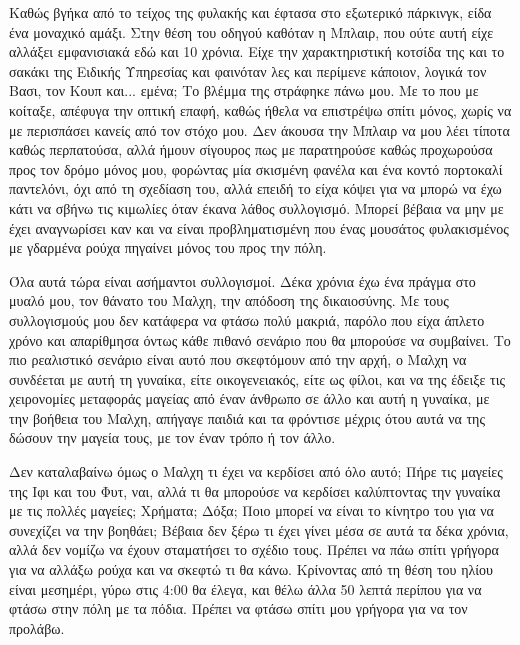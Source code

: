 \documentclass[12pt,twoside, openany]{book}
\begin{document}
Καθώς βγήκα από το τείχος της φυλακής και έφτασα στο εξωτερικό πάρκινγκ, είδα ένα μοναχικό αμάξι. Στην θέση του οδηγού καθόταν η Μπλαιρ, που ούτε αυτή είχε αλλάξει εμφανισιακά εδώ και 10 χρόνια. Είχε την χαρακτηριστική κοτσίδα της και το σακάκι της Ειδικής Υπηρεσίας και φαινόταν λες και περίμενε κάποιον, λογικά τον Βασι, τον Κουπ και... εμένα; Το βλέμμα της στράφηκε πάνω μου. Με το που με κοίταξε, απέφυγα την οπτική επαφή, καθώς ήθελα να επιστρέψω σπίτι μόνος, χωρίς να με περισπάσει κανείς από τον στόχο μου. Δεν άκουσα την Μπλαιρ να μου λέει τίποτα καθώς περπατούσα, αλλά ήμουν σίγουρος πως με παρατηρούσε καθώς προχωρούσα προς τον δρόμο μόνος μου, φορώντας μία σκισμένη φανέλα και ένα κοντό πορτοκαλί παντελόνι, όχι από τη σχεδίαση του, αλλά επειδή το είχα κόψει για να μπορώ να έχω κάτι να σβήνω τις κιμωλίες όταν έκανα λάθος συλλογισμό. Μπορεί βέβαια να μην με έχει αναγνωρίσει καν και να είναι προβληματισμένη που ένας μουσάτος φυλακισμένος με γδαρμένα ρούχα πηγαίνει μόνος του προς την πόλη.

Όλα αυτά τώρα είναι ασήμαντοι συλλογισμοί. Δέκα χρόνια έχω ένα πράγμα στο μυαλό μου, τον θάνατο του Μαλχη, την απόδοση της δικαιοσύνης. Με τους συλλογισμούς μου δεν κατάφερα να φτάσω πολύ μακριά, παρόλο που είχα άπλετο χρόνο και απαρίθμησα όντως κάθε πιθανό σενάριο που θα μπορούσε να συμβαίνει. Το πιο ρεαλιστικό σενάριο είναι αυτό που σκεφτόμουν από την αρχή, ο Μαλχη να συνδέεται με αυτή τη γυναίκα, είτε οικογενειακός, είτε ως φίλοι, και να της έδειξε τις χειρονομίες μεταφοράς μαγείας από έναν άνθρωπο σε άλλο και αυτή η γυναίκα, με την βοήθεια του Μαλχη, απήγαγε παιδιά και τα φρόντισε μέχρις ότου αυτά να της δώσουν την μαγεία τους, με τον έναν τρόπο ή τον άλλο.

Δεν καταλαβαίνω όμως ο Μαλχη τι έχει να κερδίσει από όλο αυτό; Πήρε τις μαγείες της Ιφι και του Φυτ, ναι, αλλά τι θα μπορούσε να κερδίσει καλύπτοντας την γυναίκα με τις πολλές μαγείες; Χρήματα; Δόξα; Ποιο μπορεί να είναι το κίνητρο του για να συνεχίζει να την βοηθάει; Βέβαια δεν ξέρω τι έχει γίνει μέσα σε αυτά τα δέκα χρόνια, αλλά δεν νομίζω να έχουν σταματήσει το σχέδιο τους. Πρέπει να πάω σπίτι γρήγορα για να αλλάξω ρούχα και να σκεφτώ τι θα κάνω. Κρίνοντας από τη θέση του ηλίου είναι μεσημέρι, γύρω στις 4:00 θα έλεγα, και θέλω άλλα 50 λεπτά περίπου για να φτάσω στην πόλη με τα πόδια. Πρέπει να φτάσω σπίτι μου γρήγορα για να τον προλάβω.

\chapter{}
\end{document}
